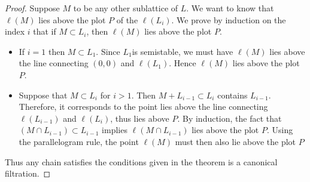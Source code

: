 \begin{proof}
    Suppose $M$ to be any other sublattice of $L$. We want to know that $\ell(M)$ lies
    above the plot $P$ of the $\ell(L_i)$. We prove by induction on the index $i$ that if $M \subset L_i$, then $\ell(M)$ lies above the
    plot $P$.
    \begin{itemize}
        \item If $i=1$ then $M\subset L_1$. Since $L_1 $is semistable, we must have $\ell(M)$ lies above the line connecting $(0,0)$ and $\ell(L_1)$. Hence $\ell(M)$ lies above the plot $P$.
        \item Suppose that $M\subset L_i$ for $i>1$. Then $M+L_{i-1} \subset L_i$ contains $L_{i-1}$. Therefore, it corresponds to the point lies above the line connecting $\ell(L_{i-1})$ and $\ell(L_i)$, thus lies above $P$.         By induction, the fact that $(M\cap L_{i-1}) \subset L_{i-1}$ implies $\ell(M\cap L_{i-1})$ lies above the plot $P$. Using the parallelogram rule, the point $\ell(M)$ must then also lie above the plot $P$
    \end{itemize}
    Thus any chain satisfies the conditions given in the theorem is a canonical filtration.
\end{proof}
